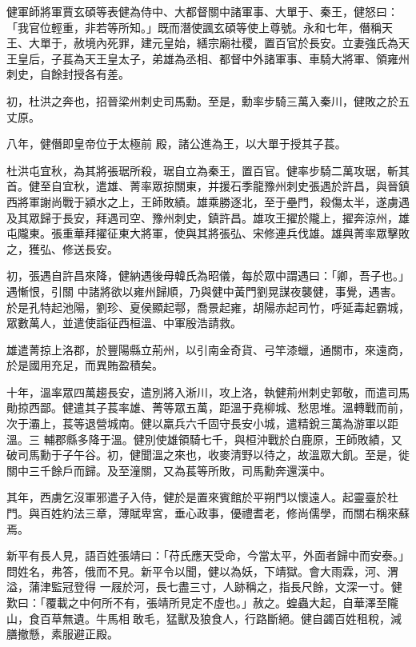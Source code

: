 \begin{pinyinscope}
 健軍師將軍賈玄碩等表健為侍中、大都督關中諸軍事、大單于、秦王，健怒曰：「我官位輕重，非若等所知。」既而潛使諷玄碩等使上尊號。永和七年，僭稱天王、大單于，赦境內死罪，建元皇始，繕宗廟社稷，置百官於長安。立妻強氏為天王皇后，子萇為天王皇太子，弟雄為丞相、都督中外諸軍事、車騎大將軍、領雍州刺史，自餘封授各有差。



 初，杜洪之奔也，招晉梁州刺史司馬勳。至是，勳率步騎三萬入秦川，健敗之於五丈原。



 八年，健僭即皇帝位于太極前
 殿，諸公進為王，以大單于授其子萇。



 杜洪屯宜秋，為其將張琚所殺，琚自立為秦王，置百官。健率步騎二萬攻琚，斬其首。健至自宜秋，遣雄、菁率眾掠關東，并援石季龍豫州刺史張遇於許昌，與晉鎮西將軍謝尚戰于潁水之上，王師敗績。雄乘勝逐北，至于壘門，殺傷太半，遂虜遇及其眾歸于長安，拜遇司空、豫州刺史，鎮許昌。雄攻王擢於隴上，擢奔涼州，雄屯隴東。張重華拜擢征東大將軍，使與其將張弘、宋修連兵伐雄。雄與菁率眾擊敗之，獲弘、修送長安。



 初，張遇自許昌來降，健納遇後母韓氏為昭儀，每於眾中謂遇曰：「卿，吾子也。」遇慚恨，引關
 中諸將欲以雍州歸順，乃與健中黃門劉晃謀夜襲健，事覺，遇害。於是孔特起池陽，劉珍、夏侯顯起鄠，喬景起雍，胡陽赤起司竹，呼延毒起霸城，眾數萬人，並遣使詣征西桓溫、中軍殷浩請救。



 雄遣菁掠上洛郡，於豐陽縣立荊州，以引南金奇貨、弓竿漆蠟，通關市，來遠商，於是國用充足，而異賄盈積矣。



 十年，溫率眾四萬趨長安，遣別將入淅川，攻上洛，執健荊州刺史郭敬，而遣司馬勛掠西鄙。健遣其子萇率雄、菁等眾五萬，距溫于堯柳城、愁思堆。溫轉戰而前，次于灞上，萇等退營城南。健以羸兵六千固守長安小城，遣精銳三萬為游軍以距溫。三
 輔郡縣多降于溫。健別使雄領騎七千，與桓沖戰於白鹿原，王師敗績，又破司馬勳于子午谷。初，健聞溫之來也，收麥清野以待之，故溫眾大飢。至是，徙關中三千餘戶而歸。及至潼關，又為萇等所敗，司馬勳奔還漢中。



 其年，西虜乞沒軍邪遣子入侍，健於是置來賓館於平朔門以懷遠人。起靈臺於杜門。與百姓約法三章，薄賦卑宮，垂心政事，優禮耆老，修尚儒學，而關右稱來蘇焉。



 新平有長人見，語百姓張靖曰：「苻氏應天受命，今當太平，外面者歸中而安泰。」問姓名，弗答，俄而不見。新平令以聞，健以為妖，下靖獄。會大雨霖，河、渭溢，蒲津監冠登得
 一屐於河，長七盡三寸，人跡稱之，指長尺餘，文深一寸。健歎曰：「覆載之中何所不有，張靖所見定不虛也。」赦之。蝗蟲大起，自華澤至隴山，食百草無遺。牛馬相敢毛，猛獸及狼食人，行路斷絕。健自蠲百姓租稅，減膳撤懸，素服避正殿。




\end{pinyinscope}
